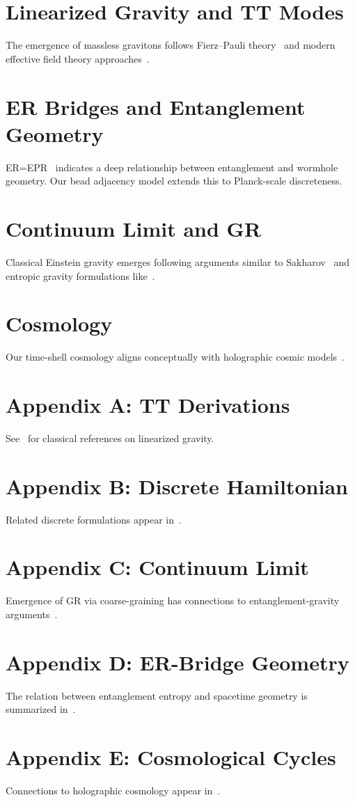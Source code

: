 \documentclass[12pt]{article}
\begin{document}
\section{Linearized Gravity and TT Modes}
The emergence of massless gravitons follows 
Fierz–Pauli theory~\cite{FierzPauli1939} and modern effective field theory 
approaches~\cite{Donoghue1994}.

\section{ER Bridges and Entanglement Geometry}
ER=EPR~\cite{Maldacena2013} indicates a deep relationship between 
entanglement and wormhole geometry. Our bead adjacency model extends this to 
Planck-scale discreteness.

\section{Continuum Limit and GR}
Classical Einstein gravity emerges following arguments similar to 
Sakharov~\cite{Sakharov1967} and entropic gravity formulations 
like~\cite{Jacobson1995, Verlinde2011}.

\section{Cosmology}
Our time-shell cosmology aligns conceptually with holographic cosmic 
models~\cite{Padmanabhan2010}.

\appendix
\section{Appendix A: TT Derivations}
See~\cite{FierzPauli1939, Donoghue1994} for classical references on 
linearized gravity.

\section{Appendix B: Discrete Hamiltonian}
Related discrete formulations appear in~\cite{Regge1961}.

\section{Appendix C: Continuum Limit}
Emergence of GR via coarse-graining has connections to 
entanglement-gravity arguments~\cite{Jacobson1995}.

\section{Appendix D: ER-Bridge Geometry}
The relation between entanglement entropy and spacetime geometry is 
summarized in~\cite{Maldacena2013}.

\section{Appendix E: Cosmological Cycles}
Connections to holographic cosmology appear in~\cite{Padmanabhan2010}.



\end{document}
